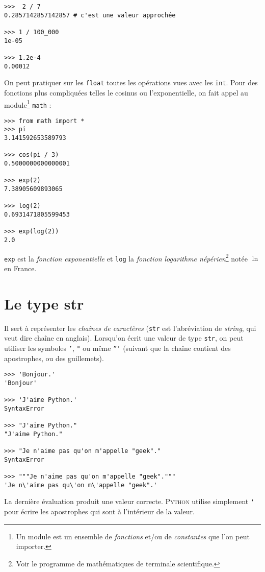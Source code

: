 \begin{pys}\begin{verbatim}
>>>  2 / 7
0.2857142857142857 # c'est une valeur approchée

>>> 1 / 100_000
1e-05

>>> 1.2e-4
0.00012
\end{verbatim}
\end{pys}

On peut pratiquer sur les \texttt{float} toutes les opérations vues avec les \texttt{int}. Pour des fonctions plus compliquées telles le cosinus ou
l'exponentielle, on fait appel au module\footnote{Un module est un ensemble de \textit{fonctions} et/ou de \textit{constantes} que l'on peut importer.}
\texttt{math} :

\begin{pys}\begin{verbatim}
>>> from math import *
>>> pi
3.141592653589793

>>> cos(pi / 3)
0.5000000000000001

>>> exp(2)
7.38905609893065

>>> log(2)
0.6931471805599453

>>> exp(log(2))
2.0
\end{verbatim}
\end{pys}

\texttt{exp} est la \textit{fonction exponentielle} et \texttt{log} la \textit{fonction logarithme népérien}\footnote{Voir le programme de mathématiques
    de terminale scientifique.} notée $\ln$ en France.



\section{Le type str}

Il sert à représenter les \textit{chaînes de caractères} (\texttt{str} est l'abréviation de \textit{string}, qui veut dire chaîne en anglais).
Lorsqu'on écrit une valeur de type \texttt{str}, on peut utiliser les symboles \texttt{'}, \texttt{"} ou même \texttt{'''} (suivant que la chaîne contient des apostrophes, ou des guillemets).

\begin{pys}\begin{verbatim}
>>> 'Bonjour.'
'Bonjour'

>>> 'J'aime Python.'
SyntaxError

>>> "J'aime Python."
"J'aime Python."

>>> "Je n'aime pas qu'on m'appelle "geek"."
SyntaxError

>>> """Je n'aime pas qu'on m'appelle "geek"."""
'Je n\'aime pas qu\'on m\'appelle "geek".'
\end{verbatim}
\end{pys}
La dernière évaluation produit une valeur correcte. \textsc{Python} utilise simplement \texttt{\'} pour écrire les apostrophes qui sont à l'intérieur de la valeur.\\


